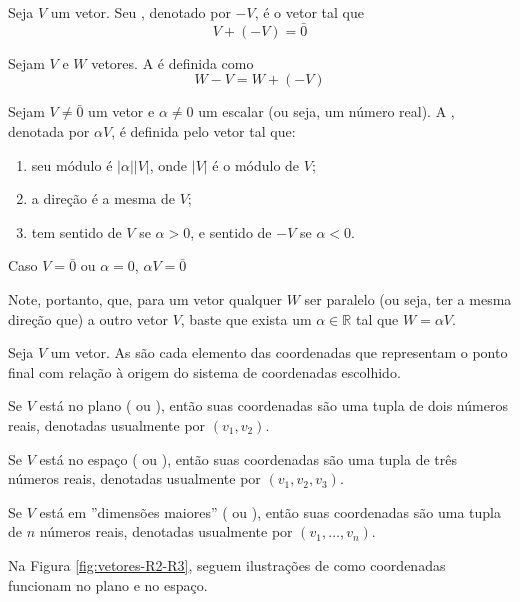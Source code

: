 \documentclass[../main.tex]{subfiles}
\begin{document}
		\begin{definicao}
			Seja $V$ um vetor. Seu , denotado por $-V$, é o vetor tal que
			\[
			V+(-V)=\bar{0}
			\]
		\end{definicao}
		\begin{definicao}
			Sejam $V$ e $W$ vetores. A  é definida como
			\[
			W-V=W+(-V)
			\]
		\end{definicao}
		\begin{definicao}
			Sejam $V\neq \bar{0}$ um vetor e $\alpha\neq 0$ um escalar (ou seja, um número real). A , denotada por $\alpha V$, é definida pelo vetor tal que:
			\begin{enumerate}[label=\roman*)]
				\item seu módulo é $|\alpha||V|$, onde $|V|$ é o módulo de $V$;
				\item a direção é a mesma de $V$;
				\item tem sentido de $V$ se $\alpha>0$, e sentido de $-V$ se $\alpha<0$.
			\end{enumerate}
			Caso $V=\bar{0}$ ou $\alpha=0$, $\alpha V=\bar{0}$
		\end{definicao}
		Note, portanto, que, para um vetor qualquer $W$ ser paralelo (ou seja, ter a mesma direção que) a outro vetor $V$, baste que exista um $\alpha\in \mathbb{R}$ tal que $W=\alpha V$. 
		\begin{definicao}
			Seja $V$ um vetor. As  são cada elemento das coordenadas que representam o ponto final com relação à origem do sistema de coordenadas escolhido.
			
			Se $V$ está no plano ( ou ), então suas coordenadas são uma tupla de dois números reais, denotadas usualmente por $(v_1, v_2)$.
			
			Se $V$ está no espaço ( ou ), então suas coordenadas são uma tupla de três números reais, denotadas usualmente por $(v_1, v_2, v_3)$.
			
			Se $V$ está em ''dimensões maiores'' ( ou ), então suas coordenadas são uma tupla de $n$ números reais, denotadas usualmente por $(v_1, \dots, v_n)$.
		\end{definicao}
		Na Figura \ref{fig:vetores-R2-R3}, seguem ilustrações de como coordenadas funcionam no plano e no espaço.
\end{document}
